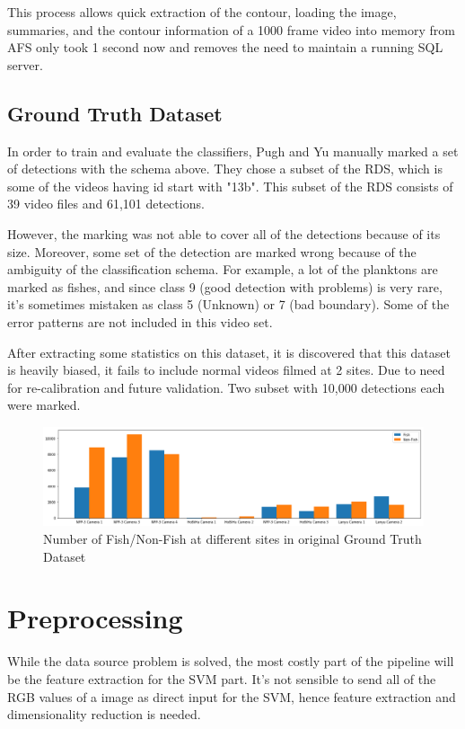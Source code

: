 \documentclass[bsc,logo,twoside,fullspacing,parskip]{infthesis}
\begin{document}
This process allows quick extraction of the contour, loading the image, summaries, and the contour information of a 1000 frame video into memory from AFS only took 1 second now and removes the need to maintain a running SQL server.

\section{Ground Truth Dataset}
\label{sec:gt}

In order to train and evaluate the classifiers, Pugh and Yu manually marked a set of detections with the schema above. They chose a subset of the RDS, which is some of the videos having id start with "13b". This subset of the RDS consists of 39 video files and 61,101 detections. 

However, the marking was not able to cover all of the detections because of its size. Moreover, some set of the detection are marked wrong because of the ambiguity of the classification schema. For example, a lot of the planktons are marked as fishes, and since class 9 (good detection with problems) is very rare, it's sometimes mistaken as class 5 (Unknown) or 7 (bad boundary). Some of the error patterns are not included in this video set.

After extracting some statistics on this dataset, it is discovered that this dataset is heavily biased, it fails to include normal videos filmed at 2 sites. Due to need for re-calibration and future validation. Two subset with 10,000 detections each were marked.

\begin{figure}[h]
    \centering
    \includegraphics[scale=0.34]{graph/classdist.png}
    \caption{Number of Fish/Non-Fish at different sites in original Ground Truth Dataset}
    \label{fig:gtdist}
\end{figure}


\chapter{Preprocessing}
\label{chap:prepro}

While the data source problem is solved, the most costly part of the pipeline will be the feature extraction for the SVM part. 
It's not sensible to send all of the RGB values of a image as direct input for the SVM, hence feature extraction and dimensionality reduction is needed.
\end{document}
